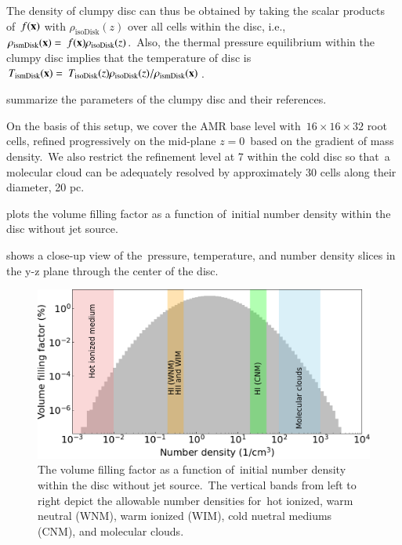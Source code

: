 \documentclass[twocolumn]{aastex631}
\begin{document}
  The density of clumpy disc can thus be obtained by taking the scalar products of\
  $f(\bold{x})$ with $\rho_{\text{isoDisk}}(z)$ over all cells within the disc, i.e.,\
  $\displaystyle\rho_{\text{ismDisk}}(\bold{x}) =\
  f(\bold{x}) \rho_{\text{isoDisk}}(z)$.\
  Also, the thermal pressure equilibrium within the clumpy disc implies that the temperature of disc is
  $\displaystyle T_{\text{ismDisk}}(\bold{x}) =\
  T_{\text{isoDisk}}(z)\rho_{\text{isoDisk}}(z)/\rho_{\text{ismDisk}}(\bold{x})$.


  \Cref{table-parameters} summarize the parameters of the clumpy disc and their references.

  On the basis of this setup, we cover the AMR base level with\
  $16\times16\times32$ root cells, refined progressively on the mid-plane $z=0$\
  based on the gradient of mass density.\
  We also restrict the refinement level at 7 within the cold disc so that\
  a molecular cloud can be adequately resolved by approximately 30 cells along their diameter, 20 pc.

   plots the volume filling factor as a function of\
  initial number density within the disc without jet source.\

   shows a close-up view of the\
  pressure, temperature, and number density slices
  in the y-z plane through the center of the disc.

  \begin{figure}
      \includegraphics[width=\columnwidth]{figures/fig__numberDensityHistogram.png}
    \caption{The volume filling factor as a function of\
             initial number density within the disc without jet source.\
             The vertical bands from left to right depict the allowable number densities \citep{peak-ism-density} for\
             hot ionized, warm neutral (WNM), warm ionized (WIM), cold nuetral mediums (CNM), and molecular clouds.}
      \label{fig__numberDensityHistogram}
  \end{figure}
\end{document}
